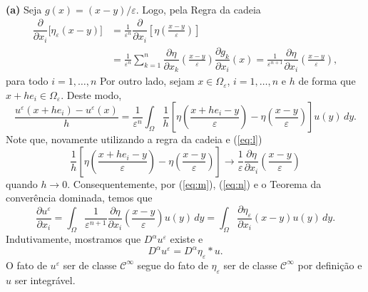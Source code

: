 \documentclass[a4paper, 11pt]{book}
\theoremstyle{definition}
\newcommand{\cC}{\mathcal{C}}
\begin{document}
\begin{prf}
    ~

    \textbf{(a)} Seja $g(x) = (x-y)/\varepsilon $. Logo, pela Regra da cadeia
    \begin{equation} \label{eq:l}
        \begin{aligned}
            \dfrac{\partial}{\partial x_i} \big[\eta_\varepsilon(x-y)\big] &= \frac{1}{\varepsilon^n}\dfrac{\partial }{\partial x_i}\left[\eta\left( \frac{x - y}{\varepsilon} \right) \right]\\ &= \frac{1}{\varepsilon^n} \sum_{k =1}^n \dfrac{\partial \eta}{\partial x_k}\left( \frac{x - y}{\varepsilon} \right) \dfrac{\partial g_k}{\partial x_i}(x) = \frac{1}{\varepsilon^{n+1}} \dfrac{\partial \eta}{\partial x_i}\left( \frac{x - y}{\varepsilon} \right),
        \end{aligned}
    \end{equation}
    para todo $i = 1,\dots,n$ Por outro lado, sejam $x \in \Omega_\varepsilon$, $i = 1,\dots,n$ e $h$ de forma que $x + he_i \in \Omega_\varepsilon$. Deste modo,
    \begin{equation} \label{eq:m}
        \frac{u^\varepsilon(x + he_i) - u^\varepsilon(x)}{h} 
            = \frac{1}{\varepsilon^n} \int_\Omega \frac{1}{h}\left[  \eta\left( \frac{x + he_i - y}{\varepsilon} \right) - \eta\left( \frac{x -y}{\varepsilon} \right) \right] u(y) \,dy.
    \end{equation} 
    Note que, novamente utilizando a regra da cadeia e (\ref{eq:l})
    \begin{equation} \label{eq:n}
        \frac{1}{h}\left[  \eta\left( \frac{x + he_i - y}{\varepsilon} \right) - \eta\left( \frac{x -y}{\varepsilon} \right) \right] \to \frac{1}{\varepsilon}\dfrac{\partial \eta}{\partial x_i}\left( \frac{x - y}{\varepsilon} \right)
    \end{equation}
    quando $h \to 0$. Consequentemente, por (\ref{eq:m}), (\ref{eq:n}) e o Teorema da converência dominada, temos que
    \[
        \dfrac{\partial u^\varepsilon}{\partial x_i} = \int_\Omega \frac{1}{\varepsilon^{n+1}} \dfrac{\partial \eta}{\partial x_i}\left( \frac{x - y}{\varepsilon} \right) u(y) \,dy = \int_\Omega \dfrac{\partial \eta_\varepsilon}{\partial x_i} (x-y) u(y) \,dy.
    \]
    Indutivamente, mostramos que $D^\alpha u^\varepsilon$ existe e
    \[
        D^\alpha u^\varepsilon = D^\alpha\eta_\varepsilon * u.
    \]
    O fato de $u^\varepsilon$ ser de classe $\cC^\infty$ segue do fato de $\eta_\varepsilon$ ser de classe $\cC^\infty$ por definição e $u$ ser integrável.


\end{prf}
\end{document}
